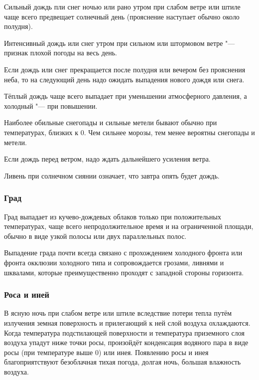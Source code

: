  Сильный дождь пли снег ночью или рано утром при слабом ветре
или штиле чаще всего предвещает солнечный день (прояснение наступает
обычно около полудня).

 Интенсивный дождь или снег утром при сильном или штормовом
ветре "--- признак плохой погоды на весь день.

 Если дождь или снег прекращается после полудня или вечером без
прояснения неба, то на следующий день надо ожидать выпадения нового
дождя или снега.

 Тёплый дождь чаще всего выпадает при уменьшении атмосферного
давления, а холодный "--- при повышении.

 Наиболее обильные снегопады и сильные метели бывают обычно при
температурах, близких к 0\grC. Чем сильнее морозы, тем менее вероятны
снегопады и метели.

 Если дождь перед ветром, надо ждать дальнейшего усиления ветра.

 Ливень при солнечном сиянии означает, что завтра опять будет дождь.

\subsubsection{Град}

Град выпадает из кучево-дождевых облаков только при положительных
температурах, чаще всего непродолжительное время и на ограниченной
площади, обычно в виде узкой полосы или двух параллельных полос.

 Выпадение града почти всегда связано с прохождением холодного
фронта или фронта окклюзии холодного типа и сопровождается грозами,
ливнями и шквалами, которые преимущественно проходят с западной
стороны горизонта.

\subsubsection{Роса и иней}

В ясную ночь при слабом ветре или штиле вследствие потери тепла путём
излучения земная поверхность и прилегающий к ней слой воздуха
охлаждаются. Когда температура подстилающей поверхности и температура
приземного слоя воздуха упадут ниже точки росы, произойдёт конденсация
водяного пара в виде росы (при температуре выше 0\grC) или инея. Появлению
росы и инея благоприятствуют безоблачная тихая погода, долгая ночь,
большая влажность воздуха.

